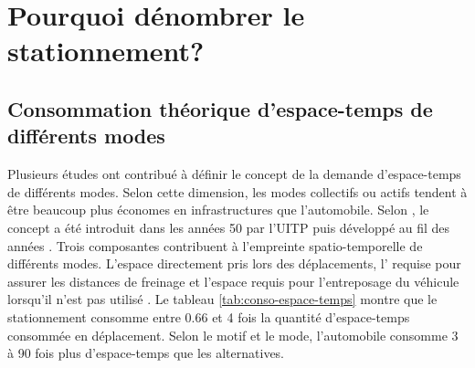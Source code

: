 \section{Pourquoi dénombrer le stationnement?}\label{sec:impacts-stationnement}
    \subsection{Consommation théorique d'espace-temps de différents modes}\label{sec:consommation-theorique-espace-temps}
        
        Plusieurs études ont contribué  à définir le concept de la demande d'espace-temps de différents modes. Selon cette dimension, les modes collectifs ou actifs tendent à être beaucoup plus économes en infrastructures que l'automobile. Selon \textcite{vuchic_time-area_1995}, le concept a été introduit dans les années 50 par l'\ac{UITP} \parencite{union_internationale_des_transports_publics_its_1959} puis développé au fil des années \parencite{marchand_concept_1984,leibbrand_transportation_1970, pushkarev_urban_1975,schmider_espace_1977}. Trois composantes contribuent à l'empreinte spatio-temporelle de différents modes. L'espace directement pris lors des déplacements, l'\fg{} requise pour assurer les distances de freinage et l'espace requis pour l'entreposage du véhicule lorsqu'il n'est pas utilisé \parencite{vuchic_time-area_1995}. Le tableau \ref{tab:conso-espace-temps} montre que le stationnement consomme entre 0.66 et 4 fois la quantité d'espace-temps consommée en déplacement. Selon le motif et le mode, l'automobile consomme 3 à 90 fois plus d'espace-temps que les alternatives. \par
